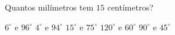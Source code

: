 Quantos milímetros tem $15$ centímetros?

$6^\circ$ e $96^\circ$
$4^\circ$ e $94^\circ$
$15^\circ$ e $75^\circ$
$120^\circ$ e $60^\circ$
$90^\circ$ e $45^\circ$




